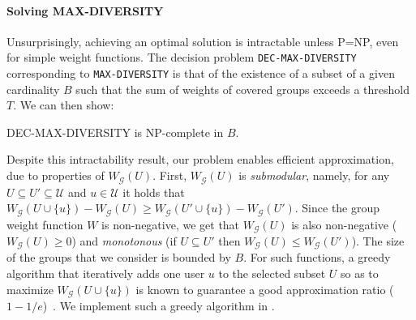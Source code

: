 \paragraph*{Solving MAX-DIVERSITY} Unsurprisingly, achieving an optimal solution is intractable unless P=NP, even for simple weight functions. The decision problem \texttt{DEC-MAX-DIVERSITY} corresponding to \texttt{MAX-DIVERSITY} is that of the existence of a subset of a given cardinality $B$ such that the sum of weights of covered groups exceeds a threshold $T$. We can then show:   

\begin{proposition}
	DEC-MAX-DIVERSITY is NP-complete in $B$.  
\end{proposition}

Despite this intractability result, our problem enables efficient approximation, due to properties of $W_{\mathcal{G}}(U)$. First, $W_{\mathcal{G}}(U)$ is \emph{submodular}, namely, for any $U\subseteq U'\subseteq \mathcal{U}$ and $u\in\mathcal{U}$ it holds that $W_{\mathcal{G}}(U\cup\{u\})-W_{\mathcal{G}}(U)\geq W_{\mathcal{G}}(U'\cup\{u\})-W_{\mathcal{G}}(U')$. Since the group weight function $W$ is non-negative, we get that $W_{\mathcal{G}}(U)$ is also non-negative ($W_{\mathcal{G}}(U)\geq 0$) and \emph{monotonous} (if $U\subseteq U'$ then $W_{\mathcal{G}}(U)\leq W_{\mathcal{G}}(U')$). The size of the groups that we consider is bounded by $B$. For such functions, a greedy algorithm that iteratively adds one user $u$ to the selected subset $U$ so as to maximize $W_{\mathcal{G}}(U\cup\{u\})$ is known to guarantee a good approximation ratio ($1-1/e$)~\cite{nemhauser1978analysis}. We implement such a greedy algorithm in \sysname{}. 










